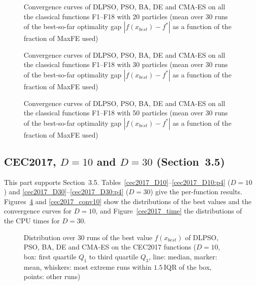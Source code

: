 \begin{figure}[!htbp]
    \centering
    \caption{Convergence curves of DLPSO, PSO, BA, DE and CMA-ES on all the classical functions F1--F18 with 20 particles (mean over 30 runs of the best-so-far optimality gap $|f(x_{best})-f^*|$ as a function of the fraction of MaxFE used)}
    \label{fig:conv_low_20}
\end{figure}

\begin{figure}[!htbp]
    \centering
    \caption{Convergence curves of DLPSO, PSO, BA, DE and CMA-ES on all the classical functions F1--F18 with 30 particles (mean over 30 runs of the best-so-far optimality gap $|f(x_{best})-f^*|$ as a function of the fraction of MaxFE used)}
    \label{fig:conv_low_30}
\end{figure}

\begin{figure}[!htbp]
    \centering
    \caption{Convergence curves of DLPSO, PSO, BA, DE and CMA-ES on all the classical functions F1--F18 with 50 particles (mean over 30 runs of the best-so-far optimality gap $|f(x_{best})-f^*|$ as a function of the fraction of MaxFE used)}
    \label{fig:conv_low_50}
\end{figure}



\FloatBarrier
\subsection{CEC2017, $D=10$ and $D=30$ (Section~3.5)}\label{app:cec}
This part supports Section~3.5. Tables~\ref{cec2017_D10}--\ref{cec2017_D10:p4} ($D=10$) and \ref{cec2017_D30}--\ref{cec2017_D30:p4} ($D=30$) give the per-function results. Figures~\ref{cec2017_op} and \ref{cec2017_conv10} show the distributions of the best values and the convergence curves for $D=10$, and Figure~\ref{cec2017_time} the distributions of the CPU times for $D=30$.


\begin{figure}[!htbp]
    \centering
    \caption{Distribution over 30 runs of the best value $f(x_{best})$ of DLPSO, PSO, BA, DE and CMA-ES on the CEC2017 functions ($D=10$, box: first quartile $Q_1$ to third quartile $Q_3$, line: median, marker: mean, whiskers: most extreme runs within $1.5\,\mathrm{IQR}$ of the box, points: other runs)}
    \label{cec2017_op}
\end{figure}


